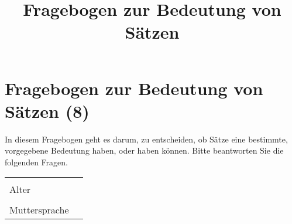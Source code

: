 \documentclass[a4paper, 8pt]{article}
\title{Fragebogen zur Bedeutung von Sätzen}
\begin{document}
\section*{Fragebogen zur Bedeutung von Sätzen (8)}

In diesem Fragebogen geht es darum, zu entscheiden, ob Sätze eine bestimmte, vorgegebene Bedeutung haben, oder haben können. Bitte beantworten Sie die folgenden Fragen.


\begin{tabular}{|l|p{5cm}|}
\hline
& \\
Alter & \\
\hline
& \\
Muttersprache & \\
\hline
\end{tabular}
\end{document}
